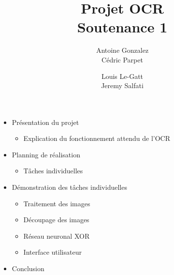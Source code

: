 \documentclass[14pt]{extarticle}
\title{
	{\Huge Projet OCR}\\
	\vspace{2em}
	{Soutenance 1}\\
}
\author{
	Antoine Gonzalez\\
	Cédric Parpet
	\and
	Louis Le-Gatt\\
	Jeremy Salfati}
\begin{document}
\maketitle
\vspace{1em}

\begin{itemize}
    \item Présentation du projet
    \begin{itemize}
        \item Explication du fonctionnement attendu de l'OCR
    \end{itemize}

    \item Planning de réalisation
    \begin{itemize}
        \item Tâches individuelles
    \end{itemize}

    \item Démonstration des tâches individuelles
    \begin{itemize}
        \item Traitement des images
        \item Découpage des images
        \item Réseau neuronal XOR
        \item Interface utilisateur
    \end{itemize}

    \item Conclusion
\end{itemize}
\end{document}
